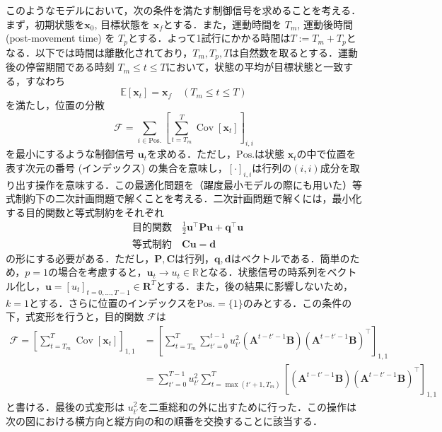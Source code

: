 \documentclass[titlepage]{ltjsbook}
\begin{document}
このようなモデルにおいて，次の条件を満たす制御信号を求めることを考える．まず，初期状態を$\mathbf{x}_0$, 目標状態を $\mathbf{x}_f$とする．また，運動時間を $T_m$, 運動後時間 (post-movement time) を $T_p$とする．よって1試行にかかる時間は$T:=T_m + T_p$となる．以下では時間は離散化されており，$T_m, T_p, T$は自然数を取るとする．運動後の停留期間である時刻 $T_m\leq t \leq T$において，状態の平均が目標状態と一致する，すなわち
\begin{equation}
\mathbb{E}\left[\mathbf{x}_{t}\right] = \mathbf{x}_f\quad (T_m\leq t \leq T)
\end{equation}
を満たし，位置の分散
\begin{equation}
\mathcal{F}=\sum_{i\in \mathrm{Pos.}}\left[\sum_{t=T_m}^{T} \operatorname{Cov}\left[\mathbf{x}_{t}\right]\right]_{i, i}
\end{equation}
を最小にするような制御信号 $\mathbf{u}_t$を求める．ただし，$\mathrm{Pos.}$は状態 $\mathbf{x}_t$の中で位置を表す次元の番号 (インデックス) の集合を意味し，$[\cdot]_{i,i}$は行列の$(i,i)$成分を取り出す操作を意味する．この最適化問題を（躍度最小モデルの際にも用いた）等式制約下の二次計画問題で解くことを考える．二次計画問題で解くには，最小化する目的関数と等式制約をそれぞれ
\begin{align}
&{\text{目的関数}}\quad {\frac {1}{2}}\mathbf{u}^\top \mathbf{P}\mathbf{u} +\mathbf{q} ^{\top}\mathbf{u}\\
&{\text{等式制約}}\quad \mathbf{C}\mathbf{u} =\mathbf{d}
\end{align}
の形にする必要がある．ただし，$\mathbf{P}, \mathbf{C}$は行列，$\mathbf{q}, \mathbf{d}$はベクトルである．簡単のため，$p=1$の場合を考慮すると，$\mathbf{u}_t \to u_{t} \in \mathbb{R}$となる．状態信号の時系列をベクトル化し，$\mathbf{u}=[u_t]_{t=0, \ldots, T-1} \in \mathbf{R}^{T}$とする．また，後の結果に影響しないため，$k=1$とする．さらに位置のインデックスを$\mathrm{Pos.}=\{1\}$のみとする．この条件の下，式変形を行うと，目的関数 $\mathcal{F}$は
\begin{align}
\mathcal{F}=\left[\sum_{t=T_m}^{T} \operatorname{Cov}\left[\mathbf{x}_{t}\right]\right]_{1,1}
&=\left[\sum_{t=T_m}^{T}\sum_{t'=0}^{t-1}u_{t'}^2\left(\mathbf{A}^{t-t'-1} \mathbf{B}\right) \left(\mathbf{A}^{t-t'-1} \mathbf{B}\right)^{\top}\right]_{1,1}\\
&=\sum_{t'=0}^{T-1} u_{t'}^2 \sum_{t=\max(t'+1, T_m)}^{T} \left[\left(\mathbf{A}^{t-t'-1} \mathbf{B}\right)\left(\mathbf{A}^{t-t'-1} \mathbf{B}\right)^{\top} \right]_{1,1}
\end{align}
と書ける．最後の式変形は $u_{t'}^2$を二重総和の外に出すために行った．この操作は次の図における横方向と縦方向の和の順番を交換することに該当する．
\end{document}
